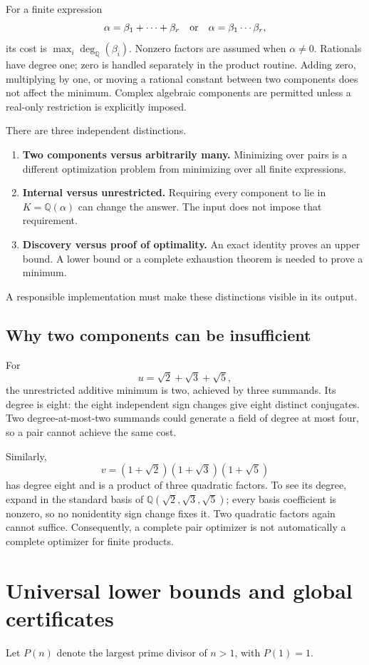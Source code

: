 \documentclass[11pt,a4paper]{article}
\newcommand{\Q}{\mathbb Q}
\newcommand{\degQ}{\operatorname{deg}_{\Q}}
\theoremstyle{remark}\newtheorem{remark}[theorem]{Remark}
\begin{document}
For a finite expression
\[
 \alpha=\beta_1+\cdots+\beta_r
 \quad\hbox{or}\quad
 \alpha=\beta_1\cdots\beta_r,
\]
its cost is $\max_i\degQ(\beta_i)$. Nonzero factors are assumed when $\alpha\ne0$. Rationals have degree one; zero is handled separately in the product routine. Adding zero, multiplying by one, or moving a rational constant between two components does not affect the minimum. Complex algebraic components are permitted unless a real-only restriction is explicitly imposed.

There are three independent distinctions.
\begin{enumerate}
\item \textbf{Two components versus arbitrarily many.} Minimizing over pairs is a different optimization problem from minimizing over all finite expressions.
\item \textbf{Internal versus unrestricted.} Requiring every component to lie in $K=\Q(\alpha)$ can change the answer. The input does not impose that requirement.
\item \textbf{Discovery versus proof of optimality.} An exact identity proves an upper bound. A lower bound or a complete exhaustion theorem is needed to prove a minimum.
\end{enumerate}
A responsible implementation must make these distinctions visible in its output.

\subsection{Why two components can be insufficient}
For
\[
 u=\sqrt2+\sqrt3+\sqrt5,
\]
the unrestricted additive minimum is two, achieved by three summands. Its degree is eight: the eight independent sign changes give eight distinct conjugates. Two degree-at-most-two summands could generate a field of degree at most four, so a pair cannot achieve the same cost.

Similarly,
\[
 v=(1+\sqrt2)(1+\sqrt3)(1+\sqrt5)
\]
has degree eight and is a product of three quadratic factors. To see its degree, expand in the standard basis of $\Q(\sqrt2,\sqrt3,\sqrt5)$; every basis coefficient is nonzero, so no nonidentity sign change fixes it. Two quadratic factors again cannot suffice. Consequently, a complete pair optimizer is not automatically a complete optimizer for finite products.

\section{Universal lower bounds and global certificates}
\label{sec:bounds}
Let $P(n)$ denote the largest prime divisor of $n>1$, with $P(1)=1$.
\end{document}
